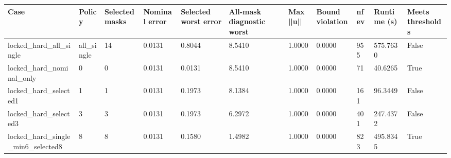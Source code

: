 \begin{tabular}{lllllllllll}
\toprule
Case & Policy & Selected masks & Nominal error & Selected worst error & All-mask diagnostic worst & Max ||u|| & Bound violation & nfev & Runtime (s) & Meets thresholds \\
\midrule
locked\_hard\_all\_single & all\_single & 14 & 0.0131 & 0.8044 & 8.5410 & 1.0000 & 0.0000 & 955 & 575.7630 & False \\
locked\_hard\_nominal\_only & 0 & 0 & 0.0131 & 0.0131 & 8.5410 & 1.0000 & 0.0000 & 71 & 40.6265 & True \\
locked\_hard\_selected1 & 1 & 1 & 0.0131 & 0.1973 & 8.1384 & 1.0000 & 0.0000 & 161 & 96.3449 & False \\
locked\_hard\_selected3 & 3 & 3 & 0.0131 & 0.1973 & 6.2972 & 1.0000 & 0.0000 & 401 & 247.4372 & False \\
locked\_hard\_single\_min6\_selected8 & 8 & 8 & 0.0131 & 0.1580 & 1.4982 & 1.0000 & 0.0000 & 823 & 495.8345 & True \\
\bottomrule
\end{tabular}
